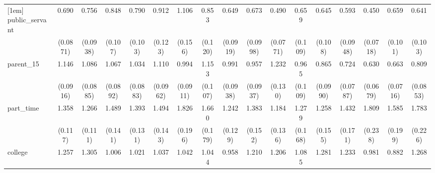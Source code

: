 {\begin{tabular}{l*{16}{c}}
[1em]
public\_servant      &       0.690\sym{**} &       0.756\sym{*}  &       0.848         &       0.790         &       0.912         &       1.106         &       0.853         &       0.649\sym{**} &       0.673\sym{**} &       0.490\sym{***}&       0.659\sym{*}  &       0.645\sym{**} &       0.593\sym{**} &       0.450\sym{***}&       0.659\sym{**} &       0.641\sym{**} \\
                    &    (0.0871)         &    (0.0938)         &     (0.107)         &     (0.103)         &     (0.123)         &     (0.156)         &     (0.120)         &    (0.0919)         &    (0.0998)         &    (0.0771)         &     (0.109)         &     (0.108)         &    (0.0948)         &    (0.0718)         &     (0.101)         &     (0.103)         \\
[1em]
parent\_15           &       1.146         &       1.086         &       1.067         &       1.034         &       1.110         &       0.994         &       1.153         &       0.991         &       0.957         &       1.232\sym{*}  &       0.965         &       0.865         &       0.724\sym{**} &       0.630\sym{***}&       0.663\sym{***}&       0.809\sym{*}  \\
                    &    (0.0916)         &    (0.0885)         &    (0.0892)         &    (0.0883)         &    (0.0962)         &    (0.0911)         &     (0.107)         &    (0.0938)         &    (0.0937)         &     (0.130)         &     (0.109)         &    (0.0990)         &    (0.0787)         &    (0.0679)         &    (0.0716)         &    (0.0853)         \\
[1em]
part\_time           &       1.358\sym{***}&       1.266\sym{**} &       1.489\sym{***}&       1.393\sym{***}&       1.494\sym{***}&       1.826\sym{***}&       1.660\sym{***}&       1.242\sym{*}  &       1.383\sym{**} &       1.184         &       1.279         &       1.258         &       1.432\sym{**} &       1.809\sym{***}&       1.585\sym{***}&       1.783\sym{***}\\
                    &     (0.117)         &     (0.111)         &     (0.141)         &     (0.131)         &     (0.143)         &     (0.196)         &     (0.179)         &     (0.129)         &     (0.152)         &     (0.136)         &     (0.168)         &     (0.155)         &     (0.171)         &     (0.238)         &     (0.199)         &     (0.226)         \\
[1em]
college             &       1.257\sym{*}  &       1.305\sym{**} &       1.006         &       1.021         &       1.037         &       1.042         &       1.044         &       0.958         &       1.210         &       1.206         &       1.085         &       1.281         &       1.233         &       0.981         &       0.882         &       1.268         \\

\end{tabular}}
